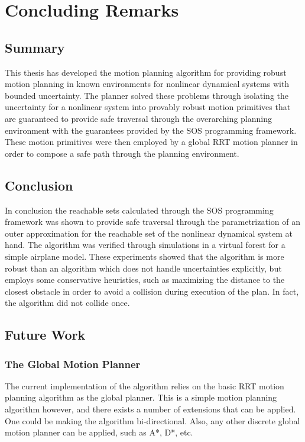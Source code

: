 \chapter{Concluding Remarks}
\label{chp:concluding-remarks}

\section{Summary}

This thesis has developed the \rrtfunnel{} motion planning algorithm for
providing robust motion planning in known environments for nonlinear dynamical
systems with bounded uncertainty. The planner solved these problems through
isolating the uncertainty for a nonlinear system into provably robust
  motion primitives that are guaranteed to provide safe traversal through the
overarching planning environment with the guarantees provided by the \ac{SOS}
programming framework. These motion primitives were then employed by a global
\ac{RRT} motion planner in order to compose a safe path through the planning
environment.

\section{Conclusion}

In conclusion the reachable sets calculated through the \ac{SOS} programming
framework was shown to provide safe traversal through the parametrization of an
outer approximation for the reachable set of the nonlinear dynamical system at
hand. The algorithm was verified through simulations in a virtual forest for a
simple airplane model. These experiments showed that the \rrtfunnel{} algorithm
is more robust than an algorithm which does not handle uncertainties explicitly,
but employs some conservative heuristics, such as maximizing the distance to the
closest obstacle in order to avoid a collision during execution of the plan. In
fact, the \rrtfunnel{} algorithm did not collide once.


\section{Future Work}

\subsection{The Global Motion Planner}

The current implementation of the \rrtfunnel{} algorithm relies on the basic
\ac{RRT} motion planning algorithm as the global planner. This is a simple
motion planning algorithm however, and there exists a number of extensions that
can be applied. One could be making the algorithm bi-directional. Also, any
other discrete global motion planner can be applied, such as A*, D*, etc.

